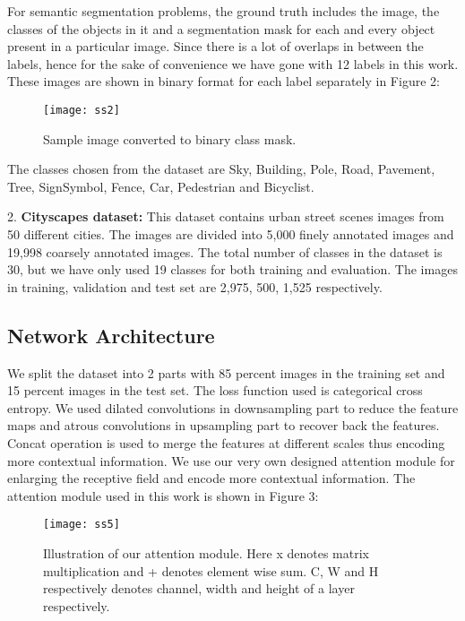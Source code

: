 \documentclass{article}
\begin{document}
For semantic segmentation problems, the ground truth includes the image, the classes of the objects in it and a segmentation mask for each and every object present in a particular image. Since there is a lot of overlaps in between the labels, hence for the sake of convenience we have gone with 12 labels in this work. These images are shown in binary format for each label separately in Figure
2:

\begin{figure}[htp]
    \centering
    \texttt{[image: ss2]}
    \caption{Sample image converted to binary class mask.}
    \label{fig3}
\end{figure}

The classes chosen from the dataset are Sky, Building, Pole, Road, Pavement, Tree, SignSymbol, Fence, Car, Pedestrian and Bicyclist.

2. \textbf{Cityscapes dataset:} This dataset contains urban street scenes images from 50 different cities. The images are divided into 5,000 finely annotated images and 19,998 coarsely annotated images. The total number of classes in the dataset is 30, but we have only used 19 classes for both training and evaluation. The images in training, validation and test set are 2,975, 500, 1,525 respectively.

\subsection{Network Architecture}

We split the dataset into 2 parts with 85 percent images in the training set and 15 percent images in the test set. The loss function used is categorical cross entropy. We used dilated convolutions in downsampling part to reduce the feature maps and atrous convolutions in upsampling part to recover back the features. Concat operation is used to merge the features at different scales thus encoding more contextual information. We use our very own designed attention module for enlarging the receptive field and encode more contextual information. The attention module used in this work is shown in Figure 3:

\begin{figure}[htp]
    \centering
    \texttt{[image: ss5]}
    \caption{Illustration of our attention module. Here x denotes matrix multiplication and + denotes element wise sum. C, W and H respectively denotes channel, width and height of a layer respectively.}
    \label{fig3}
\end{figure}
\end{document}

